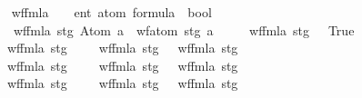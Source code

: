 \begin{isabellebody}
\isanewline
\ \ \ \ \isamarkupfalse%
\ wf{\isacharunderscore}{\kern0pt}fmla{\isacharprime}{\kern0pt}\ {\isacharcolon}{\kern0pt}{\isacharcolon}{\kern0pt}\ {\isachardoublequoteopen}{\isacharunderscore}{\kern0pt}\ {\isasymRightarrow}\ {\isacharparenleft}{\kern0pt}{\isacharprime}{\kern0pt}ent\ atom{\isacharparenright}{\kern0pt}\ formula\ {\isasymRightarrow}\ bool{\isachardoublequoteclose}\ \isanewline
\ \ \ \ \ \ {\isachardoublequoteopen}wf{\isacharunderscore}{\kern0pt}fmla{\isacharprime}{\kern0pt}\ stg\ {\isacharparenleft}{\kern0pt}Atom\ a{\isacharparenright}{\kern0pt}\ {\isasymlongleftrightarrow}\ wf{\isacharunderscore}{\kern0pt}atom{\isacharprime}{\kern0pt}\ stg\ a{\isachardoublequoteclose}\isanewline
\ \ \ \ {\isacharbar}{\kern0pt}\ {\isachardoublequoteopen}wf{\isacharunderscore}{\kern0pt}fmla{\isacharprime}{\kern0pt}\ stg\ {\isasymbottom}\ {\isasymlongleftrightarrow}\ True{\isachardoublequoteclose}\isanewline
\ \ \ \ {\isacharbar}{\kern0pt}\ {\isachardoublequoteopen}wf{\isacharunderscore}{\kern0pt}fmla{\isacharprime}{\kern0pt}\ stg\ {\isacharparenleft}{\kern0pt}{\isasymphi}{}\ \isactrlbold {\isasymand}\ {\isasymphi}{}{\isacharparenright}{\kern0pt}\ {\isasymlongleftrightarrow}\ {\isacharparenleft}{\kern0pt}wf{\isacharunderscore}{\kern0pt}fmla{\isacharprime}{\kern0pt}\ stg\ {\isasymphi}{}\ {\isasymand}\ wf{\isacharunderscore}{\kern0pt}fmla{\isacharprime}{\kern0pt}\ stg\ {\isasymphi}{}{\isacharparenright}{\kern0pt}{\isachardoublequoteclose}\isanewline
\ \ \ \ {\isacharbar}{\kern0pt}\ {\isachardoublequoteopen}wf{\isacharunderscore}{\kern0pt}fmla{\isacharprime}{\kern0pt}\ stg\ {\isacharparenleft}{\kern0pt}{\isasymphi}{}\ \isactrlbold {\isasymor}\ {\isasymphi}{}{\isacharparenright}{\kern0pt}\ {\isasymlongleftrightarrow}\ {\isacharparenleft}{\kern0pt}wf{\isacharunderscore}{\kern0pt}fmla{\isacharprime}{\kern0pt}\ stg\ {\isasymphi}{}\ {\isasymand}\ wf{\isacharunderscore}{\kern0pt}fmla{\isacharprime}{\kern0pt}\ stg\ {\isasymphi}{}{\isacharparenright}{\kern0pt}{\isachardoublequoteclose}\isanewline
\ \ \ \ {\isacharbar}{\kern0pt}\ {\isachardoublequoteopen}wf{\isacharunderscore}{\kern0pt}fmla{\isacharprime}{\kern0pt}\ stg\ {\isacharparenleft}{\kern0pt}{\isasymphi}{}\ \isactrlbold {\isasymrightarrow}\ {\isasymphi}{}{\isacharparenright}{\kern0pt}\ {\isasymlongleftrightarrow}\ {\isacharparenleft}{\kern0pt}wf{\isacharunderscore}{\kern0pt}fmla{\isacharprime}{\kern0pt}\ stg\ {\isasymphi}{}\ {\isasymand}\ wf{\isacharunderscore}{\kern0pt}fmla{\isacharprime}{\kern0pt}\ stg\ {\isasymphi}{}{\isacharparenright}{\kern0pt}{\isachardoublequoteclose}\isanewline

\end{isabellebody}
